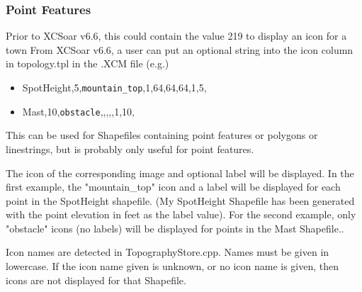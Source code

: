 \subsubsection{Point Features}
Prior to XCSoar v6.6, this could contain the value 219 to display an icon for a town
From XCSoar v6.6, a user can put an optional string into the icon column in topology.tpl in the .XCM file (e.g.)
\begin{itemize}
\item SpotHeight,5,\texttt{mountain\_top},1,64,64,64,1,5,
\item Mast,10,\texttt{obstacle},,,,,1,10,
\end{itemize}
This can be used for Shapefiles containing point features or polygons or linestrings, but is probably only useful for point features.

The icon of the corresponding image and optional label will be displayed. In the first example, 
the "mountain\_top" icon and a label will be displayed for each point in the SpotHeight shapefile. (My
SpotHeight Shapefile has been generated with the point elevation in feet as the label value). For the second example, only "obstacle" icons 
(no labels) will be displayed for points in the Mast Shapefile..

Icon names are detected in TopographyStore.cpp. Names must be given in lowercase. If the icon name given is unknown, or no icon name is given, then icons are not displayed for that Shapefile.



